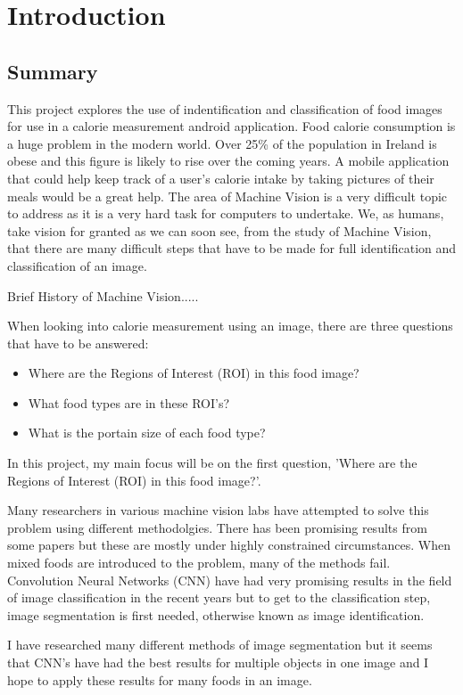 \chapter{Introduction}
\label{intro}

\section{Summary}
This project explores the use of indentification and classification of food images for use in a calorie measurement android application.
Food calorie consumption is a huge problem in the modern world.
Over 25\% of the population in Ireland is obese and this figure is likely to rise over the coming years.
A mobile application that could help keep track of a user's calorie intake by taking pictures of their meals would be a great help.
The area of Machine Vision is a very difficult topic to address as it is a very hard task for computers to undertake.
We, as humans, take vision for granted as we can soon see, from the study of Machine Vision, that there are many difficult steps that have to be made for full identification and classification of an image.

Brief History of Machine Vision.....

When looking into calorie measurement using an image, there are three questions that have to be answered:
\begin{itemize}
\item{Where are the Regions of Interest (ROI) in this food image?}
\item{What food types are in these ROI's?}
\item{What is the portain size of each food type?}
\end{itemize}
In this project, my main focus will be on the first question, 'Where are the Regions of Interest (ROI) in this food image?'.

Many researchers in various machine vision labs have attempted to solve this problem using different methodolgies.
There has been promising results from some papers but these are mostly under highly constrained circumstances.
When mixed foods are introduced to the problem, many of the methods fail.
Convolution Neural Networks (CNN) have had very promising results in the field of image classification in the recent years but to get to the classification step, image segmentation is first needed, otherwise known as image identification.

I have researched many different methods of image segmentation but it seems that CNN's have had the best results for multiple objects in one image and I hope to apply these results for many foods in an image.

